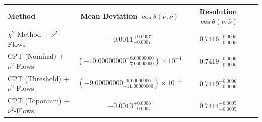     \begin{tabular}{lccc}
        \toprule
        Method & Mean Deviation $\cos\theta(\nu, \bar{\nu})$ & Resolution $\cos\theta(\nu, \bar{\nu})$ \\
        \midrule
        $\chi^2$-Method + $\nu^2$-Flows & $-0.0011^{+0.0007}_{-0.0007}$ & $0.7416^{+0.0005}_{-0.0005}$ \\
        CPT (Nominal) + $\nu^2$-Flows & $(-10.00000000^{+8.00000000}_{-7.00000000})\times 10^{-4}$ & $0.7419^{+0.0006}_{-0.0005}$ \\
        CPT (Threshold) + $\nu^2$-Flows & $(-9.00000000^{+9.00000000}_{-11.00000000})\times 10^{-4}$ & $0.7419^{+0.0006}_{-0.0006}$ \\
        CPT (Toponium) + $\nu^2$-Flows & $-0.0010^{+0.0006}_{-0.0004}$ & $0.7414^{+0.0005}_{-0.0005}$ \\
        \bottomrule
    \end{tabular}